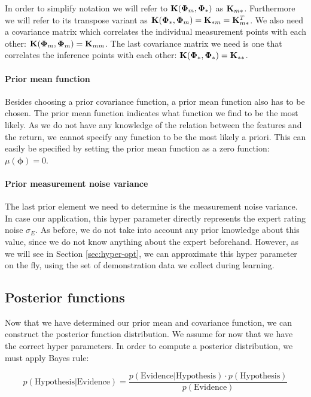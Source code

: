 \documentclass[mscThesis.tex]{subfiles}
\begin{document}
In order to simplify notation we will refer to $\mathbf{K}(\mathbf{\Phi}_{m}, \mathbf{\Phi}_{*})$ as $\mathbf{K}_{m*}$. Furthermore we will refer to its transpose variant as $\mathbf{K}(\mathbf{\Phi}_{*}, \mathbf{\Phi}_{m}) = \mathbf{K}_{*m} = \mathbf{K}_{m*}^T$. We also need a covariance matrix which correlates the individual measurement points with each other: $\mathbf{K}(\mathbf{\Phi}_{m}, \mathbf{\Phi}_{m}) = \mathbf{K}_{mm}$. The last covariance matrix we need is one that correlates the inference points with each other: $\mathbf{K}(\mathbf{\Phi}_{*}, \mathbf{\Phi}_{*}) = \mathbf{K}_{**}$.

\paragraph{Prior mean function}
Besides choosing a prior covariance function, a prior mean function also has to be chosen. The prior mean function indicates what function we find to be the most likely. As we do not have any knowledge of the relation between the features and the return, we cannot specify any function to be the most likely a priori. This can easily be specified by setting the prior mean function as a zero function: $\mu(\bm{\phi}) = 0$.

\paragraph{Prior measurement noise variance}
The last prior element we need to determine is the measurement noise variance. In case our application, this hyper parameter directly represents the expert rating noise $\sigma_E$. As before, we do not take into account any prior knowledge about this value, since we do not know anything about the expert beforehand. However, as we will see in Section \ref{sec:hyper-opt}, we can approximate this hyper parameter on the fly, using the set of demonstration data we collect during learning.

\subsection{Posterior functions}
\label{sec:gp-posterior}
Now that we have determined our prior mean and covariance function, we can construct the posterior function distribution. We assume for now that we have the correct hyper parameters. In order to compute a posterior distribution, we must apply Bayes rule:

\begin{equation*}
p(\text{Hypothesis} | \text{Evidence}) = \frac{p(\text{Evidence} | \text{Hypothesis}) \cdot p(\text{Hypothesis}) }{p(\text{Evidence})}
\end{equation*}
\end{document}
